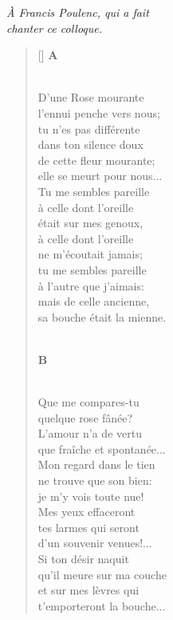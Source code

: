 \newpage



\settowidth{\versewidth}{Que fraîche et spontanée...}

\begin{flushright}
\scriptsize\emph{À Francis Poulenc, qui a fait \\
chanter ce colloque.}
\end{flushright}

\bigskip

{\itshape
\begin{verse}[\versewidth]
\qquad\qquad \textbf{A} \\ \

D'une Rose mourante \\
l'ennui penche vers nous; \\
tu n'es pas différente \\
dans ton silence doux \\
de cette fleur mourante; \\
elle se meurt pour nous... \\
Tu me sembles pareille \\
à celle dont l'oreille \\
était sur mes genoux, \\
à celle dont l'oreille \\
ne m'écoutait jamais; \\
tu me sembles pareille \\
à l'autre que j'aimais: \\
mais de celle ancienne, \\
sa bouche était la mienne.
\\ \

\qquad\qquad\textbf{B} \\ \

Que me compares-tu \\
quelque rose fânée? \\
L'amour n'a de vertu \\
que fraîche et spontanée... \\
Mon regard dans le tien \\
ne trouve que son bien: \\
je m'y vois toute nue! \\
Mes yeux effaceront \\
tes larmes qui seront \\
d'un souvenir venues!... \\
Si ton désir naquit \\
qu'il meure sur ma couche \\
et sur mes lèvres qui \\
t'emporteront la bouche...
\end{verse}
}
